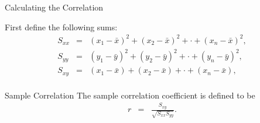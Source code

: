 \begin{frame}{Calculating the Correlation}

  First define the following sums:
  \begin{eqnarray*}
    S_{xx} & = & (x_1-\bar{x})^2 + (x_2-\bar{x})^2 + \cdot + (x_n-\bar{x})^2, \\
    S_{yy} & = & (y_1-\bar{y})^2 + (y_2-\bar{y})^2 + \cdot + (y_n-\bar{y})^2, \\
    S_{xy} & = & (x_1-\bar{x}) + (x_2-\bar{x}) + \cdot + (x_n-\bar{x}), \\
  \end{eqnarray*}

  {
    
    \begin{definition}{Sample Correlation}
      The sample correlation coefficient is defined to be
      \begin{eqnarray*}
        r & = & \frac{S_{xy}}{\sqrt{S_{xx} S_{yy}}}.
      \end{eqnarray*}
    \end{definition}

  }
  
\end{frame}


